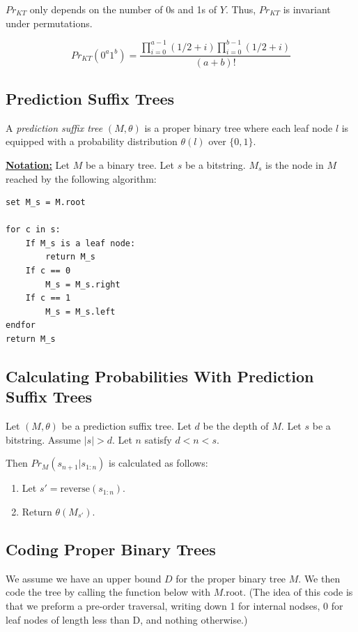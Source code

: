 \documentclass[12pt,a4paper,twoside]{article}
\theoremstyle{upright}
\begin{document}
$Pr_{KT}$ only depends on the number of 0s and 1s of $Y$. Thus, $Pr_{KT}$ is 
invariant under permutations.

\theorem
\begin{equation}
Pr_{KT}(0^a 1^b) = \frac{\displaystyle \prod_{i=0}^{a-1}{(1/2 + i)} \prod_{i=0}^{b-1}{(1/2 + i)}}
{\displaystyle(a+b)!}
\end{equation}

\subsection{Prediction Suffix Trees}

\dfn
A \emph{prediction suffix tree} $(M,\theta)$ is a proper binary tree where each leaf node
$l$ is equipped with a probability distribution $\theta(l)$
over $\{0,1\}$.

{\bf\underline {Notation:}}
Let $M$ be a binary tree. Let $s$ be a bitstring.
$M_s$ is the node in $M$ reached by the following algorithm:

\begin{verbatim}
set M_s = M.root

for c in s:
    If M_s is a leaf node:
        return M_s
    If c == 0
        M_s = M_s.right
    If c == 1
        M_s = M_s.left
endfor
return M_s

\end{verbatim}

\subsection{Calculating Probabilities With Prediction Suffix Trees}
Let $(M, \theta)$ be a prediction suffix tree.
Let $d$ be the depth of $M$.
Let $s$ be a bitstring. Assume $|s| > d$. Let $n$ satisfy $d < n < s$.


Then $Pr_M(s_{n+1} | s_{1:n})$ is calculated as follows:

\begin{enumerate}
\item Let $s' = \text{reverse}(s_{1:n})$.
\item Return $\theta(M_{s'})$.
\end{enumerate}

\subsection{Coding Proper Binary Trees}

We assume we have an upper bound $D$ for the proper binary tree $M$. We then code the tree by calling the function below with $M\text{.root}$.
(The idea of this code is that we preform a pre-order traversal, writing down 1 for internal nodses, 0 for leaf nodes of length less than D, and nothing otherwise.)
\end{document}
